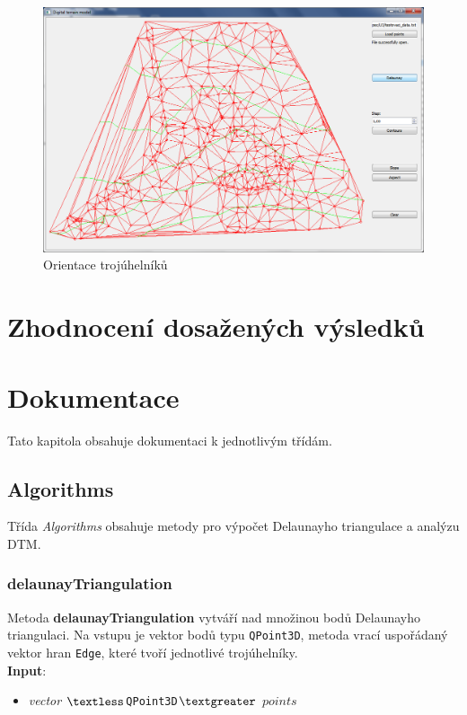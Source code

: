 \documentclass[a4paper, 12pt]{article}
\begin{document}
\begin{figure}[h!]
	\centering
	\includegraphics[width=15cm]{./pictures/app_aspect.png}
	\caption{Orientace trojúhelníků}
\end{figure}
\clearpage

\section{Zhodnocení dosažených výsledků}

\clearpage
 
\section{Dokumentace}
Tato kapitola obsahuje dokumentaci k jednotlivým třídám.

\subsection{Algorithms}
Třída \textit{Algorithms} obsahuje metody pro výpočet Delaunayho triangulace a analýzu DTM.

\subsubsection*{delaunayTriangulation}
Metoda \textbf{delaunayTriangulation} vytváří nad množinou bodů Delaunayho triangulaci. Na vstupu je vektor bodů typu \texttt{QPoint3D}, metoda vrací uspořádaný vektor hran \texttt{Edge}, které tvoří jednotlivé trojúhelníky.\\

\textbf{Input}:
\begin{itemize}
\item \textsl{vector} $\textless$\texttt{QPoint3D}$\textgreater$ $points$
\end{itemize}
\end{document}
